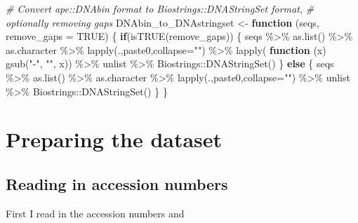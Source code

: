 \documentclass[
]{article}
\newenvironment{Shaded}{\begin{snugshade}}{\end{snugshade}}
\newcommand{\AttributeTok}[1]{\textcolor[rgb]{0.77,0.63,0.00}{#1}}
\newcommand{\CommentTok}[1]{\textcolor[rgb]{0.56,0.35,0.01}{\textit{#1}}}
\newcommand{\ConstantTok}[1]{\textcolor[rgb]{0.00,0.00,0.00}{#1}}
\newcommand{\ControlFlowTok}[1]{\textcolor[rgb]{0.13,0.29,0.53}{\textbf{#1}}}
\newcommand{\FunctionTok}[1]{\textcolor[rgb]{0.00,0.00,0.00}{#1}}
\newcommand{\NormalTok}[1]{#1}
\newcommand{\OtherTok}[1]{\textcolor[rgb]{0.56,0.35,0.01}{#1}}
\newcommand{\SpecialCharTok}[1]{\textcolor[rgb]{0.00,0.00,0.00}{#1}}
\newcommand{\StringTok}[1]{\textcolor[rgb]{0.31,0.60,0.02}{#1}}
\begin{document}
\begin{Shaded}
\begin{Highlighting}[]
\CommentTok{\# Convert ape::DNAbin format to Biostrings::DNAStringSet format,}
\CommentTok{\# optionally removing gaps}
\NormalTok{DNAbin\_to\_DNAstringset }\OtherTok{\textless{}{-}} \ControlFlowTok{function}\NormalTok{ (seqs, }\AttributeTok{remove\_gaps =} \ConstantTok{TRUE}\NormalTok{) \{}
  \ControlFlowTok{if}\NormalTok{(}\FunctionTok{isTRUE}\NormalTok{(remove\_gaps)) \{}
\NormalTok{  seqs }\SpecialCharTok{\%\textgreater{}\%} \FunctionTok{as.list}\NormalTok{() }\SpecialCharTok{\%\textgreater{}\%}\NormalTok{ as.character }\SpecialCharTok{\%\textgreater{}\%} 
      \FunctionTok{lapply}\NormalTok{(.,paste0,}\AttributeTok{collapse=}\StringTok{""}\NormalTok{) }\SpecialCharTok{\%\textgreater{}\%} 
      \FunctionTok{lapply}\NormalTok{( }\ControlFlowTok{function}\NormalTok{ (x) }\FunctionTok{gsub}\NormalTok{(}\StringTok{"{-}"}\NormalTok{, }\StringTok{""}\NormalTok{, x)) }\SpecialCharTok{\%\textgreater{}\%} 
\NormalTok{      unlist }\SpecialCharTok{\%\textgreater{}\%}\NormalTok{ Biostrings}\SpecialCharTok{::}\FunctionTok{DNAStringSet}\NormalTok{()}
\NormalTok{  \} }\ControlFlowTok{else}\NormalTok{ \{}
\NormalTok{    seqs }\SpecialCharTok{\%\textgreater{}\%} \FunctionTok{as.list}\NormalTok{() }\SpecialCharTok{\%\textgreater{}\%}\NormalTok{ as.character }\SpecialCharTok{\%\textgreater{}\%} 
      \FunctionTok{lapply}\NormalTok{(.,paste0,}\AttributeTok{collapse=}\StringTok{""}\NormalTok{) }\SpecialCharTok{\%\textgreater{}\%} 
\NormalTok{      unlist }\SpecialCharTok{\%\textgreater{}\%}\NormalTok{ Biostrings}\SpecialCharTok{::}\FunctionTok{DNAStringSet}\NormalTok{()}
\NormalTok{  \}}
\NormalTok{\}}
\end{Highlighting}
\end{Shaded}

\hypertarget{preparing-the-dataset}{%
\section{Preparing the dataset}\label{preparing-the-dataset}}

\hypertarget{reading-in-accession-numbers}{%
\subsection{Reading in accession
numbers}\label{reading-in-accession-numbers}}

First I read in the accession numbers and
\end{document}
